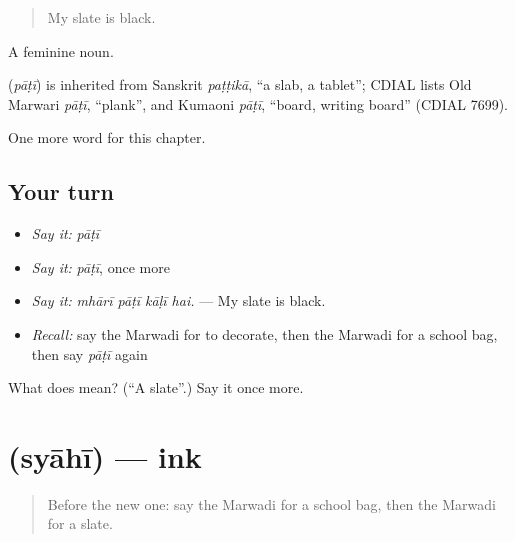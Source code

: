 \begin{quote}
My slate is black.
\end{quote}

A feminine noun.

\begin{cousinweb}
\textbf{} (\emph{pāṭī}) is inherited from Sanskrit \emph{paṭṭikā}, \textquotedblleft{}a slab, a tablet\textquotedblright{}; CDIAL lists Old Marwari \emph{pāṭī}, \textquotedblleft{}plank\textquotedblright{}, and Kumaoni \emph{pāṭī}, \textquotedblleft{}board, writing board\textquotedblright{} (CDIAL 7699).
\end{cousinweb}

\begin{grammarlens}[title={What you've built}]
One more word for this chapter.
\end{grammarlens}

\subsection*{Your turn}
\begin{itemize}
\raggedright
  \item \emph{Say it:} \emph{pāṭī}
  \item \emph{Say it:} \emph{pāṭī}, once more
  \item \emph{Say it:} \emph{mhārī pāṭī kāḷī hai.} — My slate is black.
  \item \emph{Recall:} say the Marwadi for to decorate, then the Marwadi for a school bag, then say \emph{pāṭī} again
\end{itemize}

\begin{tcolorbox}[breakable,colback=teal!4,colframe=teal!35!black,title={Before you move on}]
What does  mean? (\textquotedblleft{}A slate\textquotedblright{}.) Say it once more.
\end{tcolorbox}
\section[\texorpdfstring{\mw{स्याही} (syāhī)}{स्याही (syāhī)}]{ (syāhī) — ink}

\label{lesson:MW-C284-syahi}



\begin{quote}
Before the new one: say the Marwadi for a school bag, then the Marwadi for a slate.
\end{quote}

